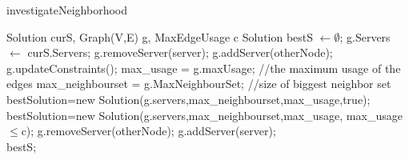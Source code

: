 \documentclass [12pt]{article}
\begin{document}
\begin {algorithm} [H]
\caption {investigateNeighborhood}
\label {localS}
\begin {algorithmic} [3]
\Require Solution curS, Graph(V,E) g, MaxEdgeUsage c 
\State Solution bestS $\gets \emptyset$;
\State g.Servers $\gets$ curS.Servers;
\State    g.removeServer(server);
\State g.addServer(otherNode);
\State g.updateConstraints();
\State max\_usage = g.maxUsage; //the maximum usage of the edges
\State max\_neighbourset = g.MaxNeighbourSet; //size of biggest neighbor set
\State bestSolution=new Solution(g.servers,max\_neighbourset,max\_usage,true);
\EndIf 
{}
\State bestSolution=new Solution(g.servers,max\_neighbourset,max\_usage, max\_usage$\leq$c);
\EndIf
\State g.removeServer(otherNode);
\EndIf
\EndFor
\State g.addServer(server);
\EndFor\\
\Return  bestS;
\end {algorithmic}
\end {algorithm}
\end{document}
